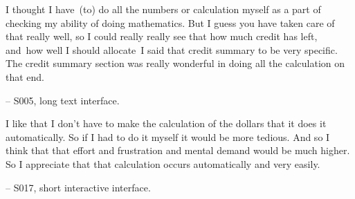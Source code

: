 \begin{displayquote}
I thought I have~\bracketellipsis (to) do all the numbers or calculation myself as a part of checking my ability of doing mathematics. But I guess you have taken care of that really well, so I could really really see that how much credit has left, and~\bracketellipsis how well I should allocate~\bracketellipsis I said that credit summary to be very specific. The credit summary section was really wonderful in doing all the calculation on that end.

\noindent \hfill -- S005, long text interface.
\end{displayquote}

\begin{displayquote}
I like that I don't have to make the calculation of the dollars that it does it automatically. So if I had to do it myself it would be more tedious. And so I think that that effort and frustration and mental demand would be much higher. So I appreciate that that calculation occurs automatically and very easily. 

\noindent \hfill -- S017, short interactive interface.
\end{displayquote}





